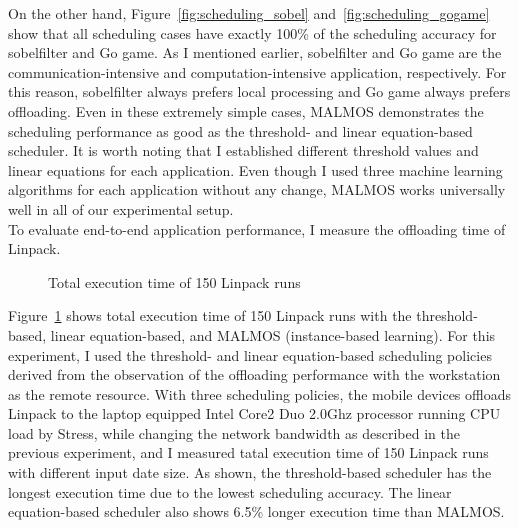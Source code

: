 {{%
On the other hand, Figure~\ref{fig:scheduling_sobel}
and~\ref{fig:scheduling_gogame} show that all scheduling
cases have exactly 100\% of the scheduling accuracy for sobelfilter and Go game.
%
As I mentioned earlier, sobelfilter and Go game are the
communication-intensive and computation-intensive application,
respectively.
%
For this reason, sobelfilter always prefers local processing and Go game
always prefers offloading.
%
Even in these extremely simple cases, MALMOS demonstrates the scheduling
performance as good as the threshold- and linear equation-based
scheduler.
%
It is worth noting that I established different threshold values and linear
equations for each application. 
%
Even though I used three machine learning algorithms for each
application without any change, MALMOS works universally well in all of
our experimental setup.\\
%
To evaluate end-to-end application performance, I measure the
offloading time of Linpack.
%
\begin{figure}
\centering
{}
\caption{Total execution time of 150 Linpack runs}
\label{fig:execution}
\end{figure}
%
Figure~\ref{fig:execution} shows total execution time of 150 Linpack runs with
the threshold-based, linear equation-based, and MALMOS (instance-based
learning).
%
For this experiment, I used the threshold- and linear equation-based
scheduling policies derived from the observation of the offloading
performance with the workstation as the remote resource.
%
With three scheduling policies, the mobile devices offloads Linpack to
the laptop equipped Intel Core2 Duo 2.0Ghz processor running CPU load by
Stress, while changing the network bandwidth as described in the previous 
experiment, and I measured tatal execution time of 150 Linpack runs with 
different input date size. 
%
As shown, the threshold-based scheduler has the longest execution
time due to the lowest scheduling accuracy.
%
The linear equation-based scheduler also shows 6.5\% longer execution
time than MALMOS. 
%

}}
